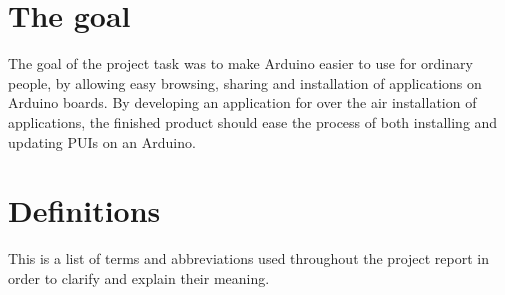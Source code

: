 \section{The goal}
The goal of the project task was to make Arduino easier to use for ordinary people, by allowing easy browsing, sharing and installation of applications on Arduino boards. By developing an application for over the air installation of applications, the finished product should ease the process of both installing and updating PUIs on an Arduino.


\section{Definitions}
This is a list of terms and abbreviations used throughout the project report in order to clarify and explain their meaning.

